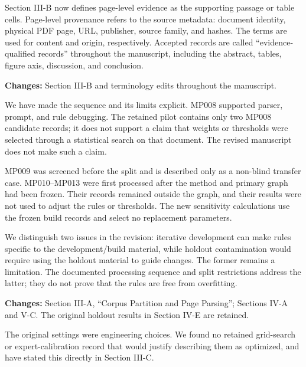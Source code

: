 
Section III-B now defines page-level evidence as the supporting passage or table cells. Page-level provenance refers to the source metadata: document identity, physical PDF page, URL, publisher, source family, and hashes. The terms are used for content and origin, respectively. Accepted records are called ``evidence-qualified records'' throughout the manuscript, including the abstract, tables, figure axis, discussion, and conclusion.

\textbf{Changes:} Section III-B and terminology edits throughout the manuscript.


We have made the sequence and its limits explicit. MP008 supported parser, prompt, and rule debugging. The retained pilot contains only two MP008 candidate records; it does not support a claim that weights or thresholds were selected through a statistical search on that document. The revised manuscript does not make such a claim.

MP009 was screened before the split and is described only as a non-blind transfer case. MP010--MP013 were first processed after the method and primary graph had been frozen. Their records remained outside the graph, and their results were not used to adjust the rules or thresholds. The new sensitivity calculations use the frozen build records and select no replacement parameters.

We distinguish two issues in the revision: iterative development can make rules specific to the development/build material, while holdout contamination would require using the holdout material to guide changes. The former remains a limitation. The documented processing sequence and split restrictions address the latter; they do not prove that the rules are free from overfitting.

\textbf{Changes:} Section III-A, ``Corpus Partition and Page Parsing''; Sections IV-A and V-C. The original holdout results in Section IV-E are retained.


The original settings were engineering choices. We found no retained grid-search or expert-calibration record that would justify describing them as optimized, and have stated this directly in Section III-C.

